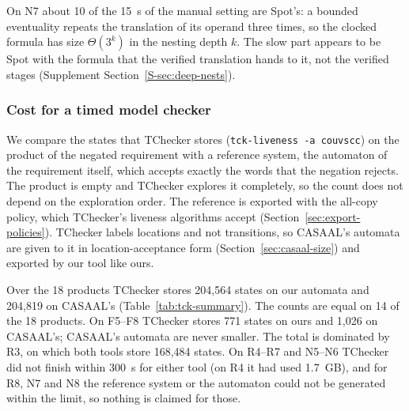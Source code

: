On N7 about 10 of the 15~s of the manual setting are Spot's: a bounded eventuality repeats the translation of its operand three times, so the clocked formula has size $\Theta(3^k)$ in the nesting depth $k$. The slow part appears to be Spot with the formula that the verified translation hands to it, not the verified stages (Supplement Section~\ref{S-sec:deep-nests}).

\subsubsection{Cost for a timed model checker}
\label{sec:casaal-tck}
We compare the states that TChecker stores (\texttt{tck-liveness -a couvscc}) on the product of the negated requirement with a reference system, the automaton of the requirement itself, which accepts exactly the words that the negation rejects. The product is empty and TChecker explores it completely, so the count does not depend on the exploration order.  The reference is exported with the all-copy policy, which TChecker's liveness algorithms accept (Section~\ref{sec:export-policies}). TChecker labels locations and not transitions, so CASAAL's automata are given to it in location-acceptance form (Section~\ref{sec:casaal-size}) and exported by our tool like ours.

\begin{table}[tp]
\centering
\caption{TChecker stored states on the product of the negated requirement with the
reference system, summed over the 18 products on which every variant completed
(F1--F12 with F3b in place of F3, R1--R3, N1--N3; the 20 completed products without F14 and N4), and over three subsets of these products.  ``Invariants removed'' deletes every location invariant. Per-product counts: Supplement Table~\ref{S-tab:casaal-tck}.}
\label{tab:tck-summary}
\small

\end{table}
Over the 18 products TChecker stores 204{,}564 states on our automata and 204{,}819 on
CASAAL's (Table~\ref{tab:tck-summary}). The counts are equal on 14 of the 18 products. On F5--F8
TChecker stores 771 states on ours and 1{,}026 on CASAAL's; CASAAL's automata are never smaller.
  The total is dominated by R3, on which both tools store
168{,}484 states. On R4--R7 and N5--N6 TChecker did not finish within 300~s for either tool (on R4
it had used 1.7~GB), and for R8, N7 and N8 the reference system or the automaton could not
be generated within the limit, so nothing is claimed for those.

